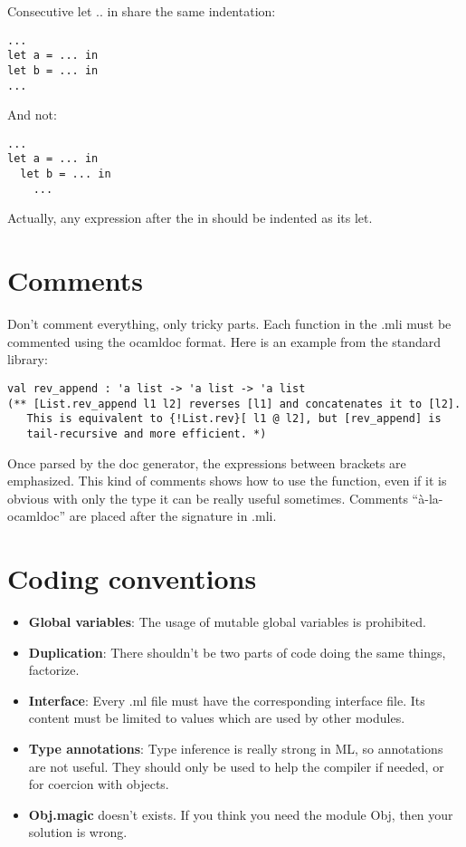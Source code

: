 \documentclass{article}
\begin{document}
Consecutive \textsf{let .. in} share the same indentation:

\begin{verbatim}
...
let a = ... in
let b = ... in
...
\end{verbatim}

And not:

\begin{verbatim}
...
let a = ... in
  let b = ... in
    ...
\end{verbatim}

Actually, any expression after the \textsf{in} should be indented as its
\textsf{let}.

\section{Comments}

Don't comment everything, only tricky parts. Each function in the .mli must be
commented using the ocamldoc format. Here is an example from the standard
library:

\begin{verbatim}
val rev_append : 'a list -> 'a list -> 'a list
(** [List.rev_append l1 l2] reverses [l1] and concatenates it to [l2].
   This is equivalent to {!List.rev}[ l1 @ l2], but [rev_append] is
   tail-recursive and more efficient. *)
\end{verbatim}

Once parsed by the doc generator, the expressions between brackets are
emphasized. This kind of comments shows how to use the function, even if it is
obvious with only the type it can be really useful sometimes. Comments
``à-la-ocamldoc'' are placed after the signature in .mli.

\section{Coding conventions}

\begin{itemize}
\item \textbf{Global variables}: The usage of mutable global variables is
  prohibited.
\item \textbf{Duplication}: There shouldn't be two parts of code doing the same
  things, factorize.
\item \textbf{Interface}: Every .ml file must have the corresponding interface
  file. Its content must be limited to values which are used by other
  modules. 
\item \textbf{Type annotations}: Type inference is really strong in ML, so
  annotations are not useful. They should only be used to help the compiler if
  needed, or for coercion with objects.
\item \textbf{Obj.magic} doesn't exists. If you think you need the module
  \textsf{Obj}, then your solution is wrong.
\end{itemize}
\end{document}
